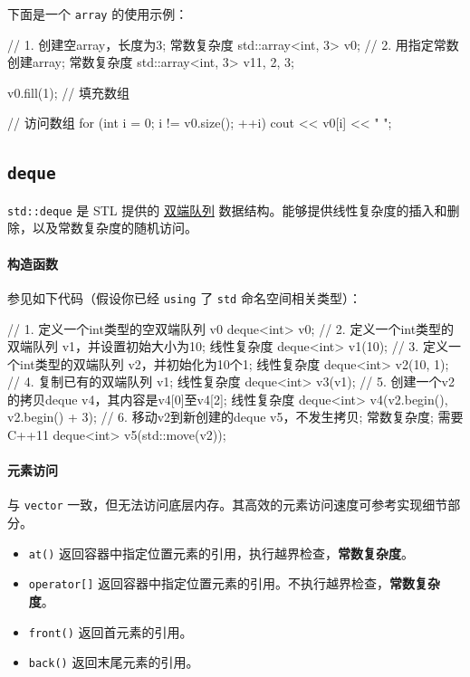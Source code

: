 下面是一个 \texttt{array} 的使用示例：


\begin{codeline}
// 1. 创建空array，长度为3; 常数复杂度
std::array<int, 3> v0;
// 2. 用指定常数创建array; 常数复杂度
std::array<int, 3> v1{1, 2, 3};

v0.fill(1);  // 填充数组

// 访问数组
for (int i = 0; i != v0.size(); ++i) cout << v0[i] << " ";
\end{codeline}


\subsection{\texorpdfstring{\texttt{deque}}{deque}}\label{deque}

\texttt{std::deque} 是 STL 提供的 \href{../../ds/queue.md\#双端队列}{双端队列} 数据结构。能够提供线性复杂度的插入和删除，以及常数复杂度的随机访问。

\paragraph{构造函数}\label{ux6784ux9020ux51fdux6570-1}

参见如下代码（假设你已经 \texttt{using} 了 \texttt{std} 命名空间相关类型）：


\begin{codeline}
// 1. 定义一个int类型的空双端队列 v0
deque<int> v0;
// 2. 定义一个int类型的双端队列 v1，并设置初始大小为10; 线性复杂度
deque<int> v1(10);
// 3. 定义一个int类型的双端队列 v2，并初始化为10个1; 线性复杂度
deque<int> v2(10, 1);
// 4. 复制已有的双端队列 v1; 线性复杂度
deque<int> v3(v1);
// 5. 创建一个v2的拷贝deque v4，其内容是v4[0]至v4[2]; 线性复杂度
deque<int> v4(v2.begin(), v2.begin() + 3);
// 6. 移动v2到新创建的deque v5，不发生拷贝; 常数复杂度; 需要 C++11
deque<int> v5(std::move(v2));
\end{codeline}


\paragraph{元素访问}\label{ux5143ux7d20ux8bbfux95ee-2}

与 \texttt{vector} 一致，但无法访问底层内存。其高效的元素访问速度可参考实现细节部分。

\begin{itemize}
\tightlist
\item
  \texttt{at()} 返回容器中指定位置元素的引用，执行越界检查，\textbf{常数复杂度}。
\item
  \texttt{operator{[}{]}} 返回容器中指定位置元素的引用。不执行越界检查，\textbf{常数复杂度}。
\item
  \texttt{front()} 返回首元素的引用。
\item
  \texttt{back()} 返回末尾元素的引用。
\end{itemize}

